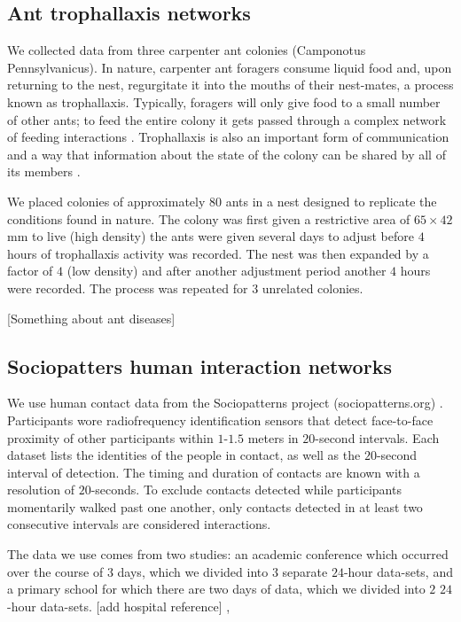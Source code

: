 \documentclass[10pt]{article}
\begin{document}
\begin{multicols}{2}
\subsection{Ant trophallaxis networks}
We collected data from three carpenter ant colonies (Camponotus Pennsylvanicus). In nature, carpenter ant foragers consume liquid food and, upon returning to the nest, regurgitate it into the mouths of their nest-mates, a process known as trophallaxis. Typically, foragers will only give food to a small number of other ants; to feed the entire colony it gets passed through a complex network of feeding interactions \cite{quevillon2015social}. Trophallaxis is also an important form of communication and a way that information about the state of the colony can be shared by all of its members \cite{greenwald2015ant,10.7554/eLife.20375}.

We placed colonies of approximately $80$ ants in a nest designed to replicate the conditions found in nature. The colony was first given a restrictive area of $65\times42$mm to live (high density) the ants were given several days to adjust before $4$ hours of trophallaxis activity was recorded. The nest was then expanded by a factor of $4$ (low density) and after another adjustment period another $4$ hours were recorded. The process was repeated for $3$ unrelated colonies.

[Something about ant diseases]
\subsection{Sociopatters human interaction networks}
We use human contact data from the Sociopatterns project (sociopatterns.org) \cite{isella2011s,10.1371/journal.pone.0073970,10.1371/journal.pone.0023176}. Participants wore radiofrequency identification sensors that detect face-to-face proximity of other participants within $1$-$1.5$ meters in $20$-second intervals. Each dataset lists the identities of the people in contact, as well as the $20$-second interval of detection. The timing and duration of contacts are known with a resolution of $20$-seconds. To exclude contacts detected while participants momentarily walked past one another, only contacts detected in at least two consecutive intervals are considered interactions.

The data we use comes from two studies: an academic conference which occurred over the course of $3$ days, which we divided into $3$ separate $24$-hour data-sets, and a primary school for which there are two days of data, which we divided into $2$ $24$-hour data-sets. 
[add hospital reference]
\cite{isella2011s},\cite{10.1371/journal.pone.0023176}

\end{multicols}
\end{document}
